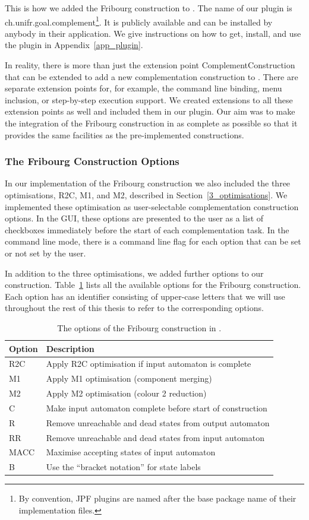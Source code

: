 This is how we added the Fribourg construction to \goal. The name of our plugin is \textsf{ch.unifr.goal.complement}\footnote{By convention, JPF plugins are named after the base package name of their implementation files.}. It is publicly available and can be installed by anybody in their \goal{} application. We give instructions on how to get, install, and use the plugin in Appendix~\ref{app_plugin}.

In reality, there is more than just the extension point \textsf{ComplementConstruction} that can be extended to add a new complementation construction to \goal. There are separate extension points for, for example, the command line binding, menu inclusion, or step-by-step execution support. We created extensions to all these extension points as well and included them in our plugin. Our aim was to make the integration of the Fribourg construction in \goal{} as complete as possible so that it provides the same facilities as the pre-implemented constructions.

\subsubsection{The Fribourg Construction Options}
In our implementation of the Fribourg construction we also included the three optimisations, R2C, M1, and M2, described in Section~\ref{3_optimisations}. We implemented these optimisation as user-selectable complementation construction options. In the GUI, these options are presented to the user as a list of checkboxes immediately before the start of each complementation task. In the command line mode, there is a command line flag for each option that can be set or not set by the user.

In addition to the three optimisations, we added further options to our construction. Table~\ref{goal_options} lists all the available options for the Fribourg construction. Each option has an identifier consisting of upper-case letters that we will use throughout the rest of this thesis to refer to the corresponding options.

\begin{table}
\centering
\begin{tabular}{ll}
\hline
Option & Description \\
\hline
R2C & Apply R2C optimisation if input automaton is complete \\
M1 & Apply M1 optimisation (component merging) \\
M2 & Apply M2 optimisation (colour 2 reduction) \\
C & Make input automaton complete before start of construction \\
R & Remove unreachable and dead states from output automaton \\
RR & Remove unreachable and dead states from input automaton \\
MACC & Maximise accepting states of input automaton \\
B & Use the ``bracket notation'' for state labels \\
\hline
\end{tabular}
\caption{The options of the Fribourg construction in \goal.}
\label{goal_options}
\end{table}

